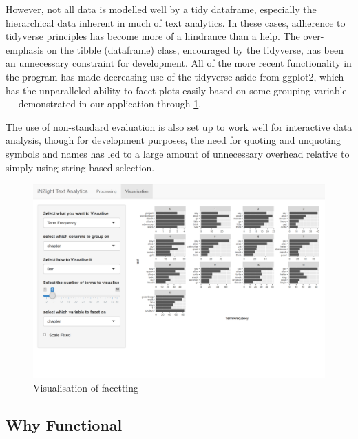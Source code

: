 \message{ !name(jason-cairns-dissertation.tex)}\documentclass[11pt, a4paper, titlepage]{report}
\begin{document}
However, not all data is modelled well by a tidy dataframe, especially
the hierarchical data inherent in much of text analytics. In these
cases, adherence to tidyverse principles has become more of a
hindrance than a help. The over-emphasis on the tibble (dataframe)
class, encouraged by the tidyverse, has been an unnecessary constraint
for development. All of the more recent functionality in the program
has made decreasing use of the tidyverse aside from ggplot2, which has
the unparalleled ability to facet plots easily based on some grouping
variable --- demonstrated in our application through
\cref{fig:visualisation-facetting}.

The use of non-standard evaluation is also set up to work well for
interactive data analysis, though for development purposes, the need
for quoting and unquoting symbols and names has led to a large amount
of unnecessary overhead relative to simply using string-based
selection.

\begin{figure}
\centering
\includegraphics[scale=0.35]{visualisation-facetting.png}
\caption{Visualisation of facetting\label{fig:visualisation-facetting}}
\end{figure}

\subsection{Why Functional}\label{sec:why-functional}
\end{document}
